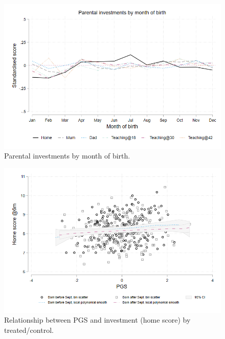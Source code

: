 \documentclass{article}
\begin{document}
\begin{figure}[H]
\centering 
\includegraphics[width=1\linewidth]{../figures/Invest_MoB.png}
\caption{Parental investments by month of birth.}
\label{fig:Invest_MoB}
\end{figure}

\begin{figure}[H]
\centering 
\includegraphics[width=1\linewidth]{../figures/PGSxTreat_home.png}
\caption{Relationship between PGS and investment (home score) by treated/control.}
\label{fig:PGSxTreat_home}
\end{figure}
\end{document}
